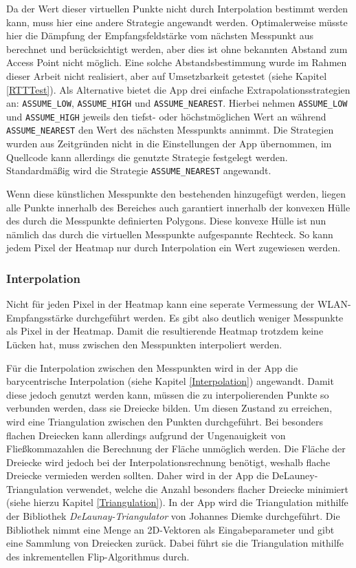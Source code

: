 \documentclass[10pt]{scrartcl}
\newcommand{\inlcode}{\texttt}
\begin{document}
Da der Wert dieser virtuellen Punkte nicht durch Interpolation bestimmt werden kann, muss hier eine andere Strategie angewandt werden. Optimalerweise müsste hier die Dämpfung der Empfangsfeldstärke vom nächsten Messpunkt aus berechnet und berücksichtigt werden, aber dies ist ohne bekannten Abstand zum Access Point nicht möglich. Eine solche Abstandsbestimmung wurde im Rahmen dieser Arbeit nicht realisiert, aber auf Umsetzbarkeit getestet (siehe Kapitel \ref{RTTTest}). Als Alternative bietet die App drei einfache Extrapolationsstrategien an: \inlcode{ASSUME\_LOW}, \inlcode{ASSUME\_HIGH} und \inlcode{ASSUME\_NEAREST}. Hierbei nehmen \inlcode{ASSUME\_LOW} und \inlcode{ASSUME\_HIGH} jeweils den tiefst- oder höchstmöglichen Wert an während \inlcode{ASSUME\_NEAREST} den Wert des nächsten Messpunkts annimmt. Die Strategien wurden aus Zeitgründen nicht in die Einstellungen der App übernommen, im Quellcode kann allerdings die genutzte Strategie festgelegt werden. Standardmäßig wird die Strategie \inlcode{ASSUME\_NEAREST} angewandt.

Wenn diese künstlichen Messpunkte den bestehenden hinzugefügt werden, liegen alle Punkte innerhalb des Bereiches auch garantiert innerhalb der konvexen Hülle des durch die Messpunkte definierten Polygons. Diese konvexe Hülle ist nun nämlich das durch die virtuellen Messpunkte aufgespannte Rechteck. So kann jedem Pixel der Heatmap nur durch Interpolation ein Wert zugewiesen werden.

\subsubsection{Interpolation}
Nicht für jeden Pixel in der Heatmap kann eine seperate Vermessung der WLAN-Empfangsstärke durchgeführt werden. Es gibt also deutlich weniger Messpunkte als Pixel in der Heatmap. Damit die resultierende Heatmap trotzdem keine Lücken hat, muss zwischen den Messpunkten interpoliert werden.

Für die Interpolation zwischen den Messpunkten wird in der App die barycentrische Interpolation (siehe Kapitel \ref{Interpolation}) angewandt. Damit diese jedoch genutzt werden kann, müssen die zu interpolierenden Punkte so verbunden werden, dass sie Dreiecke bilden. Um diesen Zustand zu erreichen, wird eine Triangulation zwischen den Punkten durchgeführt. Bei besonders flachen Dreiecken kann allerdings aufgrund der Ungenauigkeit von Fließkommazahlen die Berechnung der Fläche unmöglich werden. Die Fläche der Dreiecke wird jedoch bei der Interpolationsrechnung benötigt, weshalb flache Dreiecke vermieden werden sollten. Daher wird in der App die DeLauney-Triangulation verwendet, welche die Anzahl besonders flacher Dreiecke minimiert (siehe hierzu Kapitel \ref{Triangulation}). In der App wird die Triangulation mithilfe der Bibliothek \textit{DeLaunay-Triangulator} von Johannes Diemke \cite{jdi2015} durchgeführt. Die Bibliothek nimmt eine Menge an 2D-Vektoren als Eingabeparameter und gibt eine Sammlung von Dreiecken zurück. Dabei führt sie die Triangulation mithilfe des inkrementellen Flip-Algorithmus durch.
\end{document}
